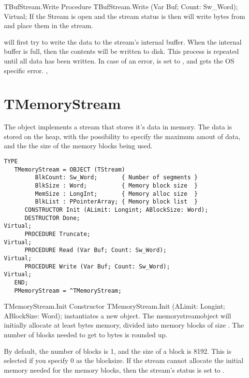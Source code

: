 \begin{procedure}{TBufStream.Write}
\Declaration
Procedure TBufStream.Write (Var Buf; Count: Sw\_Word); Virtual;
\Description
If the Stream is open and the stream status is  then 
 will write  bytes from  and place them
in the stream.

 will first try to write the data to the stream's internal
buffer. When the internal buffer is full, then the contents will be written 
to disk. This process is repeated until all data has been written.
\Errors
In case of an error,  is set to , and
 gets the OS specific error.
\SeeAlso
{}, 

\end{procedure}

\section{TMemoryStream}
\label{se:TMemoryStream}

The  object implements a stream that stores it's data
in memory. The data is stored on the heap, with the possibility to specify
the maximum amout of data, and the the size of the memory blocks being used.
 
\begin{verbatim}
TYPE
   TMemoryStream = OBJECT (TStream)
         BlkCount: Sw_Word;       { Number of segments }
         BlkSize : Word;          { Memory block size  }
         MemSize : LongInt;       { Memory alloc size  }
         BlkList : PPointerArray; { Memory block list  }
      CONSTRUCTOR Init (ALimit: Longint; ABlockSize: Word);
      DESTRUCTOR Done;                                               Virtual;
      PROCEDURE Truncate;                                            Virtual;
      PROCEDURE Read (Var Buf; Count: Sw_Word);                      Virtual;
      PROCEDURE Write (Var Buf; Count: Sw_Word);                     Virtual;
   END;
   PMemoryStream = ^TMemoryStream;
\end{verbatim}

\begin{procedure}{TMemoryStream.Init}
\Declaration
Constructor TMemoryStream.Init (ALimit: Longint; ABlockSize: Word);
\Description
{} instantiates a new  object. The
memorystreamobject will initially allocate at least  bytes memory, 
divided into memory blocks of size . 
The number of blocks needed to get to  bytes is rounded up.

By default, the number of blocks is 1, and the size of a block is 8192. This
is selected if you specify 0 as the blocksize.
\Errors
If the stream cannot allocate the initial memory needed for the memory blocks, then
the stream's status is set to .
\SeeAlso
{}
\end{procedure}

